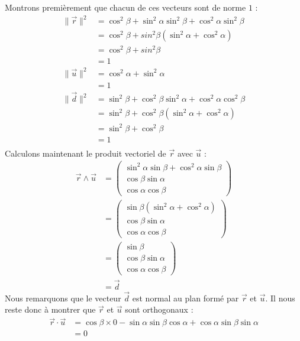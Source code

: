 Montrons premièrement que chacun de ces vecteurs sont de norme $1$ :
\begin{align*}
\lVert \vec{r} \rVert^2 &= \cos^2\beta+\sin^2\alpha\sin^2\beta+\cos^2\alpha\sin^2\beta \\
                &= \cos^2\beta+sin^2\beta(\sin^2\alpha+\cos^2\alpha) \\
                &= \cos^2\beta+sin^2\beta \\
                &= 1 \\[2mm]
\lVert \vec{u} \rVert^2 &= \cos^2\alpha+\sin^2\alpha \\
                &= 1 \\[2mm]
\lVert \vec{d} \rVert^2 &= \sin^2\beta+\cos^2\beta\sin^2\alpha+\cos^2\alpha\cos^2\beta \\
                &= \sin^2\beta+\cos^2\beta(\sin^2\alpha+\cos^2\alpha) \\
                &= \sin^2\beta+\cos^2\beta \\
                &= 1 \\[2mm]
\end{align*}
Calculons maintenant le produit vectoriel de $\vec{r}$ avec $\vec{u}$ :
\begin{align*}
\vec{r} \wedge \vec{u} &= \begin{pmatrix} \sin^2\alpha\sin\beta+\cos^2\alpha\sin\beta \\ \cos\beta\sin\alpha \\ \cos\alpha\cos\beta \end{pmatrix} \\
                       &= \begin{pmatrix} \sin\beta(\sin^2\alpha+\cos^2\alpha) \\ \cos\beta\sin\alpha \\  \cos\alpha\cos\beta \end{pmatrix} \\
                       &= \begin{pmatrix} \sin\beta \\ \cos\beta\sin\alpha \\ \cos\alpha\cos\beta \end{pmatrix} \\
                       &= \vec{d}
\end{align*}
Nous remarquons que le vecteur $\vec{d}$ est normal au plan formé par $\vec{r}$ et $\vec{u}$. Il nous reste donc à montrer que $\vec{r}$ et $\vec{u}$ sont orthogonaux :
\begin{align*}
\vec{r} \cdot \vec{u} &= \cos\beta\times0-\sin\alpha\sin\beta\cos\alpha+\cos\alpha\sin\beta\sin\alpha \\
                      &= 0
\end{align*}
